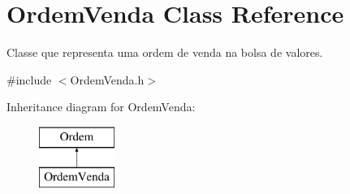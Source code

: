 \hypertarget{class_ordem_venda}{}\section{Ordem\+Venda Class Reference}
\label{class_ordem_venda}


Classe que representa uma ordem de venda na bolsa de valores.  




{\ttfamily \#include $<$Ordem\+Venda.\+h$>$}

Inheritance diagram for Ordem\+Venda\+:\begin{figure}[H]
\begin{center}
\leavevmode
\includegraphics[height=2.000000cm]{class_ordem_venda}
\end{center}
\end{figure}
